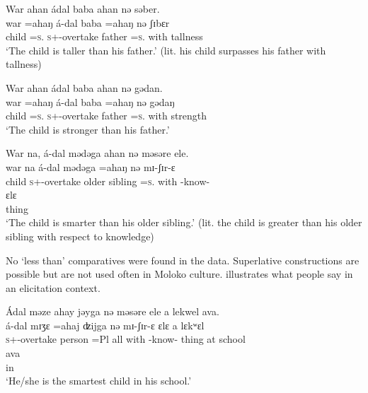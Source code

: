 \ea \label{ex:5:128}
War  ahan  ádal  baba  ahan  nə  səber.\\
\gll  war =ahaŋ     á-dal       baba   =ahaŋ     nə   ʃɪbɛr\\
      child   =\textsc{s}.{\POSS}   \textsc{s}+{\IFV}-overtake   father   =\textsc{s}.{\POSS}  with  tallness\\
\glt  ‘The child is taller than his father.’ (lit. his child surpasses his father with tallness)  
\z

\ea \label{ex:5:129}
War  ahan  ádal  baba  ahan  nə  gədan.\\
\gll  war   =ahaŋ    á-dal     baba   =ahaŋ     nə   gədaŋ\\
      child   =\textsc{s}.{\POSS}   \textsc{s}+{\IFV}-overtake   father   =\textsc{s}.{\POSS}  with  strength\\
\glt  ‘The child is stronger than his father.’ 
\z

\ea \label{ex:5:130}
War  na,  á-dal  mədəga  ahan  nə  məsəre  ele.\\
\gll  war   na   á-dal        mədəga   =ahaŋ     nə   mɪ{}-ʃɪr-ɛ \\    
      child   {\PSP}   \textsc{s}+{\IFV}-overtake    {older sibling}   =\textsc{s}.{\POSS}  with   {\NOM}{}-know-{\CL}\\  
      
      \medskip
\gll ɛlɛ\\
     thing\\
\glt  ‘The child is smarter than his older sibling.’ (lit. the child is greater than his older sibling with respect to knowledge)
\z

No ‘less than’ comparatives were found in the data. Superlative constructions are possible but are not used often in Moloko culture.   illustrates what people say in an elicitation context.

\ea \label{ex:5:131}
Ádal  məze  ahay  jəyga  nə  məsəre  ele  a  lekwel  ava.\\
\gll  á-dal     mɪʒɛ   =ahaj   ʣijga   nə  mɪ{}-ʃɪr-ɛ    ɛlɛ  a  lɛkʷɛl \\ 
      \textsc{s}+{\IFV}-overtake  person  =Pl  all  with  {\NOM}{}-know-{\CL}  thing  at  school\\  
      
      \medskip
\gll ava\\
     in\\     
\glt  ‘He/she is the smartest child in his school.’
\z

